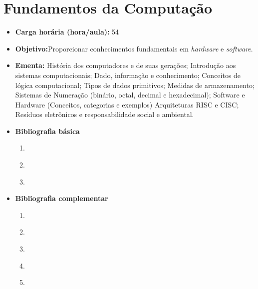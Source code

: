 \documentclass[11pt,fleqn]{book} %
\begin{document}
\newpage
\section{Fundamentos da Computação}\label{1_fundcomp}
\begin{itemize}
	\item \textbf{Carga horária (hora/aula):} 54
	\item \textbf{Objetivo:}Proporcionar conhecimentos fundamentais em \textit{hardware} e \textit{software}.
	\item \textbf{Ementa:} 
	História dos computadores e de suas gerações; 
	Introdução aos sistemas computacionais;
	Dado, informação e conhecimento;
	Conceitos de lógica computacional; 
	Tipos de dados primitivos;
	Medidas de armazenamento; 
	Sistemas de Numeração (binário, octal, decimal e hexadecimal);
	Software e Hardware (Conceitos, categorias e exemplos) 
	Arquiteturas RISC e CISC; 
	Resíduos eletrônicos e responsabilidade social e ambiental.
	\item \textbf{Bibliografia básica}
	\begin{enumerate}
		\item \cite{souza_2008}
		\item \cite{stallings_2010}
		\item \cite{tanenbaum_austin_2013}
	\end{enumerate}
	\item \textbf{Bibliografia complementar}
	\begin{enumerate}
		\item \cite{weber_2012}
		\item \cite{monteiro_2007}
		\item \cite{torres_2015}
		\item \cite{morimoto_2010}
		\item \cite{brookshear_lee_oliveira} 
	\end{enumerate}	
\end{itemize}

\newpage
\end{document}

